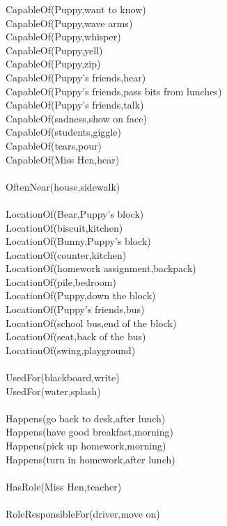 \begin{multicols}{2}
\begin{footnotesize}
CapableOf(Puppy,want to know) \\
CapableOf(Puppy,wave arms) \\
CapableOf(Puppy,whisper) \\
CapableOf(Puppy,yell) \\
CapableOf(Puppy,zip) \\
CapableOf(Puppy's friends,hear) \\
CapableOf(Puppy's friends,pass bits from lunches) \\
CapableOf(Puppy's friends,talk) \\
CapableOf(sadness,show on face) \\
CapableOf(students,giggle) \\
CapableOf(tears,pour) \\
CapableOf(Miss Hen,hear) \\
~\\
OftenNear(house,sidewalk) \\
~\\
LocationOf(Bear,Puppy's block) \\
LocationOf(biscuit,kitchen) \\
LocationOf(Bunny,Puppy's block) \\
LocationOf(counter,kitchen) \\
LocationOf(homework assignment,backpack) \\
LocationOf(pile,bedroom) \\
LocationOf(Puppy,down the block) \\
LocationOf(Puppy's friends,bus) \\
LocationOf(school bus,end of the block) \\
LocationOf(seat,back of the bus) \\
LocationOf(swing,playground) \\
~\\
UsedFor(blackboard,write) \\
UsedFor(water,splash) \\
~\\
Happens(go back to desk,after lunch) \\
Happens(have good breakfast,morning) \\
Happens(pick up homework,morning) \\
Happens(turn in homework,after lunch) \\
~\\
HasRole(Miss Hen,teacher) \\
~\\
RoleResponsibleFor(driver,move on) \\

\end{footnotesize}
\end{multicols}
